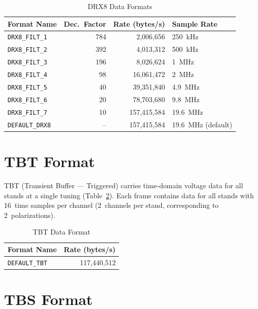 \begin{longtable}{l r r l}
\caption{DRX8 Data Formats}
\label{tab:drx8-formats} \\
\toprule
\textbf{Format Name} & \textbf{Dec.\ Factor} & \textbf{Rate (bytes/s)}
    & \textbf{Sample Rate} \\
\midrule
\endfirsthead
\endhead
\bottomrule
\endfoot

\texttt{DRX8\_FILT\_1} & 784 &   2,006,656 & 250~kHz  \\
\texttt{DRX8\_FILT\_2} & 392 &   4,013,312 & 500~kHz  \\
\texttt{DRX8\_FILT\_3} & 196 &   8,026,624 & 1~MHz    \\
\texttt{DRX8\_FILT\_4} &  98 &  16,061,472 & 2~MHz    \\
\texttt{DRX8\_FILT\_5} &  40 &  39,351,840 & 4.9~MHz  \\
\texttt{DRX8\_FILT\_6} &  20 &  78,703,680 & 9.8~MHz  \\
\texttt{DRX8\_FILT\_7} &  10 & 157,415,584 & 19.6~MHz \\
\texttt{DEFAULT\_DRX8} &  -- & 157,415,584 & 19.6~MHz (default) \\

\end{longtable}

\section{TBT Format}

TBT (Transient Buffer --- Triggered) carries time-domain voltage data for all stands
at a single tuning (Table~\ref{tab:tbt-format}).  Each frame contains data for all stands with 16~time
samples per channel (2~channels per stand, corresponding to 2~polarizations).

\begin{longtable}{l r}
\caption{TBT Data Format}
\label{tab:tbt-format} \\
\toprule
\textbf{Format Name} & \textbf{Rate (bytes/s)} \\
\midrule
\endfirsthead
\endhead
\bottomrule
\endfoot

\texttt{DEFAULT\_TBT} & 117,440,512 \\

\end{longtable}

\section{TBS Format}

